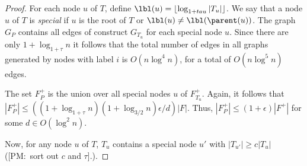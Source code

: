 \documentclass{patmorin}
\newcommand{\note}[2]{{\color{red}[#1:~#2]}}
\DeclareMathOperator{\diam}{diam}
\begin{document}
\begin{proof}
  For each node $u$ of $T$, define $\lbl(u)=\floor{\log_{1+tau}|T_u|}$. We
  say that a node $u$ of $T$ is \emph{special} if $u$ is the root of $T$
  or $\lbl(u)\neq\lbl(\parent(u))$.  The graph $G_P$ contains all edges
  of construct $G_{T_u}$ for each special node $u$.  Since there are only
  $1+\log_{1+\tau} n$ it follows that the total number of edges in
  all graphs generated by nodes with label $i$ is $O(n\log^4 n)$,
  for a total of $O(n\log^5 n)$ edges.

  The set $F^+_P$ is the union over all special nodes $u$ of $F^+_{T_u}$.
  Again, it follows that $|F^+_P| \le ((1+\log_{1+\tau}n)(1+\log_{3/2}
  n)\epsilon/d)|F|$.  Thus, $|F^+_P|\le (1+\epsilon)|F^+|$ for some
  $d\in O(\log^2 n)$.

	Now, for any node $u$ of $T$, $T_u$ contains a special node $u'$ with $|T_{u'}|\ge c|T_u|$ (\note{PM}{sort out $c$ and $\tau$}.).
\end{proof}


%
%	    
%	    
%
%
%



\end{document}
